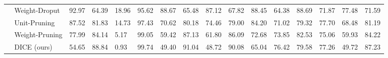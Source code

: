 \documentclass[runningheads]{llncs}
\begin{document}
\begin{sidewaystable}
{\begin{tabular}{llllllllllllllll}
 & Weight-Droput & 92.97 & 64.39 & 18.96 & 95.62 & 88.67 & 65.48 & 87.12 & 67.82 & 88.45 & 64.38 & 88.69 & 71.87 & 77.48 & 71.59 \\
 & Unit-Pruning & 87.52 & 81.83 & 14.73 & 97.43 & 70.62 & 80.18 & 74.46 & 79.00 & 84.20 & 71.02 & 79.32 & 77.70 & 68.48 & 81.19 \\
 & Weight-Pruning & 77.99 & 84.14 & 5.17 & 99.05 & 59.42 & 87.13 & 61.80 & 86.09 & 72.68 & 73.85 & 82.53 & 75.06 & 59.93 & 84.22 \\
 & {DICE} (ours) 
  & 54.65 & 88.84 & 0.93 & 99.74 & 49.40 & 91.04 & 48.72 & 90.08 & 65.04 & 76.42 & 79.58 & 77.26 & 49.72 & 87.23 
\\ \bottomrule
\end{tabular}}

\label{tab:detail-results-cifar100}
\end{sidewaystable}


 
\end{document}

